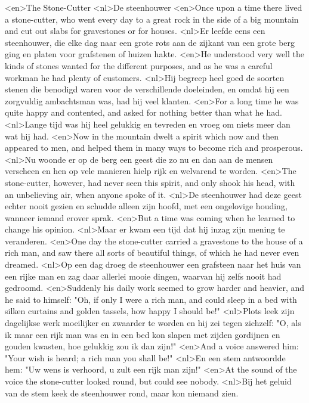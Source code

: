 <en>The Stone-Cutter
<nl>De steenhouwer
<en>Once upon a time there lived a stone-cutter, who went every day to a great rock in the side of a big mountain and cut out slabs for gravestones or for houses.
<nl>Er leefde eens een steenhouwer, die elke dag naar een grote rots aan de zijkant van een grote berg ging en platen voor grafstenen of huizen hakte.
<en>He understood very well the kinds of stones wanted for the different purposes, and as he was a careful workman he had plenty of customers.
<nl>Hij begreep heel goed de soorten stenen die benodigd waren voor de verschillende doeleinden, en omdat hij een zorgvuldig ambachtsman was, had hij veel klanten.
<en>For a long time he was quite happy and contented, and asked for nothing better than what he had.
<nl>Lange tijd was hij heel gelukkig en tevreden en vroeg om niets meer dan wat hij had.
<en>Now in the mountain dwelt a spirit which now and then appeared to men, and helped them in many ways to become rich and prosperous.
<nl>Nu woonde er op de berg een geest die zo nu en dan aan de mensen verscheen en hen op vele manieren hielp rijk en welvarend te worden.
<en>The stone-cutter, however, had never seen this spirit, and only shook his head, with an unbelieving air, when anyone spoke of it.
<nl>De steenhouwer had deze geest echter nooit gezien en schudde alleen zijn hoofd, met een ongelovige houding, wanneer iemand erover sprak.
<en>But a time was coming when he learned to change his opinion.
<nl>Maar er kwam een tijd dat hij inzag zijn mening te veranderen.
<en>One day the stone-cutter carried a gravestone to the house of a rich man, and saw there all sorts of beautiful things, of which he had never even dreamed.
<nl>Op een dag droeg de steenhouwer een grafsteen naar het huis van een rijke man en zag daar allerlei mooie dingen, waarvan hij zelfs nooit had gedroomd.
<en>Suddenly his daily work seemed to grow harder and heavier, and he said to himself: "Oh, if only I were a rich man, and could sleep in a bed with silken curtains and golden tassels, how happy I should be!"
<nl>Plots leek zijn dagelijkse werk moeilijker en zwaarder te worden en hij zei tegen zichzelf: "O, als ik maar een rijk man was en in een bed kon slapen met zijden gordijnen en gouden kwasten, hoe gelukkig zou ik dan zijn!"
<en>And a voice answered him: "Your wish is heard; a rich man you shall be!"
<nl>En een stem antwoordde hem: "Uw wens is verhoord, u zult een rijk man zijn!"
<en>At the sound of the voice the stone-cutter looked round, but could see nobody.
<nl>Bij het geluid van de stem keek de steenhouwer rond, maar kon niemand zien.
